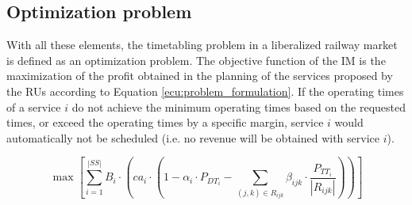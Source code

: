 \documentclass[Afour,sagev,times]{sagej}
\begin{document}
\subsection{Optimization problem}
\label{sec:optimization_problem}

With all these elements, the timetabling problem in a liberalized railway market is defined as an optimization problem. The objective function of the \gls{IM} is the maximization of the profit obtained in the planning of the services proposed by the \glspl{RU} according to Equation \ref{ecu:problem_formulation}. If the operating times of a service $ i $ do not achieve the minimum operating times based on the requested times, or exceed the operating times by a specific margin, service $ i $ would automatically not be scheduled (i.e. no revenue will be obtained with service $ i $). 

\begin{equation} \label{ecu:problem_formulation}
{\scriptstyle\max \left[ \sum_{i=1}^{|SS|} B_i \cdot \left( ca_i \cdot \left( 1 - \alpha_{i} \cdot P_{DT_{i}} - \sum_{(j,k) \in R_{ijk}} \beta_{ijk} \cdot \frac{P_{TT_{i}}}{|R_{ijk}|} \right) \right) \right]
}
\end{equation}
\end{document}
